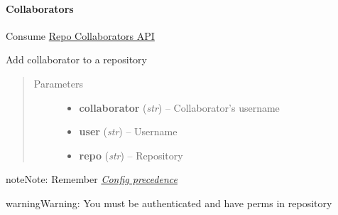 \documentclass[letterpaper,10pt,english]{sphinxmanual}
\begin{document}
\begin{fulllineitems}
\begin{fulllineitems}
\end{fulllineitems}


\end{fulllineitems}



\paragraph{Collaborators}
\label{repos:collaborators}\label{repos:collaborators-service}

\begin{fulllineitems}
\label{repos:pygithub3.services.repos.Collaborators}
Consume \href{http://developer.github.com/v3/repos/collaborators}{Repo Collaborators API}

\begin{fulllineitems}
\label{repos:pygithub3.services.repos.Collaborators.add}
Add collaborator to a repository
\begin{quote}\begin{description}
\item[{Parameters}] \leavevmode\begin{itemize}
\item {} 
\textbf{collaborator} (\emph{str}) -- Collaborator's username

\item {} 
\textbf{user} (\emph{str}) -- Username

\item {} 
\textbf{repo} (\emph{str}) -- Repository

\end{itemize}

\end{description}\end{quote}

\begin{notice}{note}{Note:}
Remember {\hyperref[repos:config-precedence]{\emph{Config precedence}}}
\end{notice}

\begin{notice}{warning}{Warning:}
You must be authenticated and have perms in repository
\end{notice}


\end{fulllineitems}
\end{fulllineitems}
\end{document}
